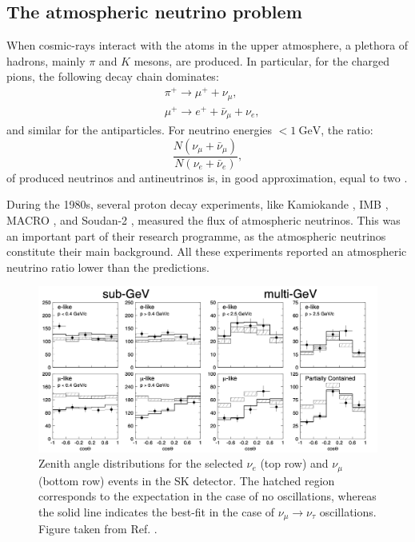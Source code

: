 \subsection{The atmospheric neutrino problem}

When cosmic-rays interact with the atoms in the upper atmosphere, a plethora of hadrons, mainly $\pi$ and $K$ mesons, are produced. In particular, for the charged pions, the following decay chain dominates:
\begin{equation}
	\begin{split}
		&\pi^{+} \longrightarrow \mu^{+} + \nu_{\mu},\\
		&\mu^{+} \longrightarrow e^{+} + \bar{\nu}_{\mu} + \nu_{e},
	\end{split}
\end{equation}
and similar for the antiparticles. For neutrino energies $< 1~\mathrm{GeV}$, the ratio:
\begin{equation}
	\frac{N(\nu_{\mu}+\bar{\nu}_{\mu})}{N(\nu_{e}+\bar{\nu}_{e})},
\end{equation}
of produced neutrinos and antineutrinos is, in good approximation, equal to two \cite{Gaisser2002}.

During the 1980s, several proton decay experiments, like Kamiokande \cite{Hirata1988}, IMB \cite{Casper1991}, MACRO \cite{Ambrosio1998}, and Soudan-2 \cite{Allison1997}, measured the flux of atmospheric neutrinos. This was an important part of their research programme, as the atmospheric neutrinos constitute their main background. All these experiments reported an atmospheric neutrino ratio lower than the predictions.

\begin{figure}[t]
	\centering
	\includegraphics[width=.90\linewidth]{Images/Nu/superk_oscillations.png}
	\caption[Zenith angle distributions for the selected $\nu_{e}$ and $\nu_{\mu}$ events in the SK detector.]{Zenith angle distributions for the selected $\nu_{e}$ (top row) and $\nu_{\mu}$ (bottom row) events in the SK detector. The hatched region corresponds to the expectation in the case of no oscillations, whereas the solid line indicates the best-fit in the case of $\nu_{\mu} \rightarrow \nu_{\tau}$ oscillations. Figure taken from Ref. \cite{SuperKamiokande1998}.}
	\label{fig:atmospheric_nu_osc}
\end{figure}

